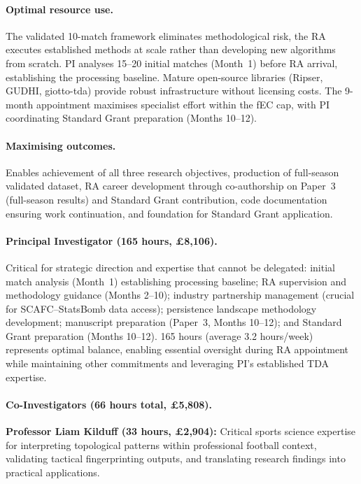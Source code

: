\paragraph{Optimal resource use.}
The validated 10-match framework \citep{Brown2026} eliminates methodological risk, the RA executes established methods at scale rather than developing new algorithms from scratch. PI analyses 15--20 initial matches (Month~1) before RA arrival, establishing the processing baseline. Mature open-source libraries (Ripser, GUDHI, giotto-tda) provide robust infrastructure without licensing costs. The 9-month appointment maximises specialist effort within the fEC cap, with PI coordinating Standard Grant preparation (Months 10--12).

\paragraph{Maximising outcomes.}
Enables achievement of all three research objectives, production of full-season validated dataset, RA career development through co-authorship on Paper~3 (full-season results) and Standard Grant contribution, code documentation ensuring work continuation, and foundation for Standard Grant application.

\paragraph{Principal Investigator (165 hours, \pounds8{,}106).}
Critical for strategic direction and expertise that cannot be delegated: initial match analysis (Month~1) establishing processing baseline; RA supervision and methodology guidance (Months 2--10); industry partnership management (crucial for SCAFC--StatsBomb data access); persistence landscape methodology development; manuscript preparation (Paper~3, Months 10--12); and Standard Grant preparation (Months 10--12). 165 hours (average 3.2 hours/week) represents optimal balance, enabling essential oversight during RA appointment while maintaining other commitments and leveraging PI's established TDA expertise.

\paragraph{Co-Investigators (66 hours total, \pounds5{,}808).}

\textbf{Professor Liam Kilduff (33 hours, \pounds2{,}904):} Critical sports science expertise for interpreting topological patterns within professional football context, validating tactical fingerprinting outputs, and translating research findings into practical applications.

